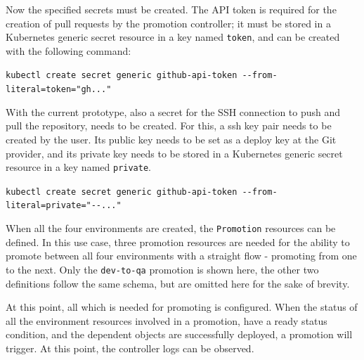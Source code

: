 

%
%
%
%
%

Now the specified secrets must be created.
The API token is required for the creation of pull requests by the promotion controller;
it must be stored in a Kubernetes generic secret resource in a key named \lstinline|token|,
and can be created with the following command:

\lstinline|kubectl create secret generic github-api-token --from-literal=token="gh..."|

With the current prototype, also a secret for the SSH connection to push and pull
the repository, needs to be created.
For this, a ssh key pair needs to be created by the user. Its public key needs to 
be set as a deploy key at the Git provider,
and its private key needs to be stored in a
Kubernetes generic secret resource in a key named \lstinline|private|.

\lstinline|kubectl create secret generic github-api-token --from-literal=private="--..."|

When all the four environments are created, the \lstinline|Promotion| resources
can be defined.
In this use case, three promotion resources are needed for the ability to
promote between all four environments with a straight flow - promoting from one to the next.
Only the \lstinline|dev-to-qa| promotion is shown here,
the other two definitions follow the same schema,
but are omitted here for the sake of brevity.

\newpage



%
%
%





At this point, all which is needed for promoting is configured.
When the status of all the environment resources involved in a promotion,
have a ready status condition,
and the dependent objects are successfully deployed,
a promotion will trigger.
%
At this point, the controller logs can be observed.

